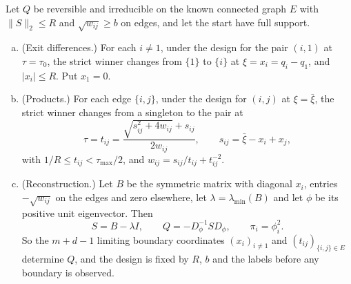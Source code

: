 \begin{theorem}\label{thm:reversible-reconstruction}
Let $Q$ be reversible and irreducible on the known connected graph $E$ with $\|S\|_2\le R$ and
$\sqrt{w_{ij}}\ge b$ on edges, and let the start have full support.
\begin{enumerate}[(a)]
\item (Exit differences.) For each $i\ne1$, under the design for the pair $(i,1)$ at
$\tau=\tau_0$, the strict winner changes from $\{1\}$ to $\{i\}$ at $\xi=x_i=q_i-q_1$, and
$|x_i|\le R$. Put $x_1=0$.
\item (Products.) For each edge $\{i,j\}$, under the design for $(i,j)$ at $\xi=\bar\xi$, the
strict winner changes from a singleton to the pair at
\[
 \tau=t_{ij}=\frac{\sqrt{s_{ij}^2+4w_{ij}}+s_{ij}}{2w_{ij}},\qquad
 s_{ij}=\bar\xi-x_i+x_j,
\]
with $1/R\le t_{ij}<\tau_{\max}/2$, and $w_{ij}=s_{ij}/t_{ij}+t_{ij}^{-2}$.
\item (Reconstruction.) Let $B$ be the symmetric matrix with diagonal $x_i$, entries
$-\sqrt{w_{ij}}$ on the edges and zero elsewhere, let $\lambda=\lambda_{\min}(B)$ and let $\phi$ be
its positive unit eigenvector. Then
\[
 S=B-\lambda I,\qquad Q=-D_\phi^{-1}SD_\phi,\qquad \pi_i=\phi_i^2 .
\]
So the $m+d-1$ limiting boundary coordinates $(x_i)_{i\ne1}$ and $(t_{ij})_{\{i,j\}\in E}$
determine $Q$, and the design is fixed by $R$, $b$ and the labels before any boundary is
observed.
\end{enumerate}
\end{theorem}

